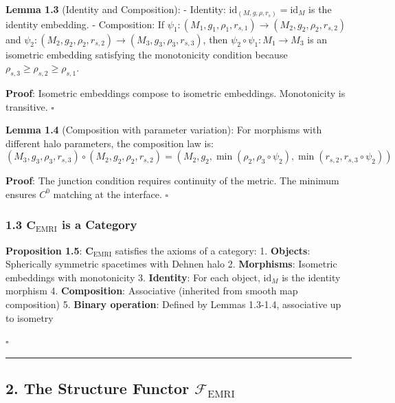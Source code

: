 \documentclass[
]{article}
\begin{document}
\textbf{Lemma 1.3} (Identity and Composition): - Identity:
\(\text{id}_{(M,g,\rho,r_s)} = \text{id}_M\) is the identity embedding.
- Composition: If
\(\psi_1: (M_1, g_1, \rho_1, r_{s,1}) \to (M_2, g_2, \rho_2, r_{s,2})\)
and
\(\psi_2: (M_2, g_2, \rho_2, r_{s,2}) \to (M_3, g_3, \rho_3, r_{s,3})\),
then \(\psi_2 \circ \psi_1: M_1 \to M_3\) is an isometric embedding
satisfying the monotonicity condition because
\(\rho_{s,3} \geq \rho_{s,2} \geq \rho_{s,1}\).

\textbf{Proof}: Isometric embeddings compose to isometric embeddings.
Monotonicity is transitive. \(\square\)

\textbf{Lemma 1.4} (Composition with parameter variation): For morphisms
with different halo parameters, the composition law is:
\[(M_3, g_3, \rho_3, r_{s,3}) \circ (M_2, g_2, \rho_2, r_{s,2}) = (M_2, g_2, \min(\rho_2, \rho_3 \circ \psi_2), \min(r_{s,2}, r_{s,3} \circ \psi_2))\]

\textbf{Proof}: The junction condition requires continuity of the
metric. The minimum ensures \(C^0\) matching at the interface.
\(\square\)

\subsubsection{\texorpdfstring{1.3 \(\mathbf{C}_{\text{EMRI}}\) is a
Category}{1.3 \textbackslash mathbf\{C\}\_\{\textbackslash text\{EMRI\}\} is a Category}}\label{mathbfc_textemri-is-a-category}

\textbf{Proposition 1.5}: \(\mathbf{C}_{\text{EMRI}}\) satisfies the
axioms of a category: 1. \textbf{Objects}: Spherically symmetric
spacetimes with Dehnen halo 2. \textbf{Morphisms}: Isometric embeddings
with monotonicity 3. \textbf{Identity}: For each object, \(\text{id}_M\)
is the identity morphism 4. \textbf{Composition}: Associative (inherited
from smooth map composition) 5. \textbf{Binary operation}: Defined by
Lemmas 1.3-1.4, associative up to isometry

\(\square\)

\begin{center}\rule{0.5\linewidth}{0.5pt}\end{center}

\subsection{\texorpdfstring{2. The Structure Functor
\(\mathcal{F}_{\text{EMRI}}\)}{2. The Structure Functor \textbackslash mathcal\{F\}\_\{\textbackslash text\{EMRI\}\}}}\label{the-structure-functor-mathcalf_textemri}
\end{document}
